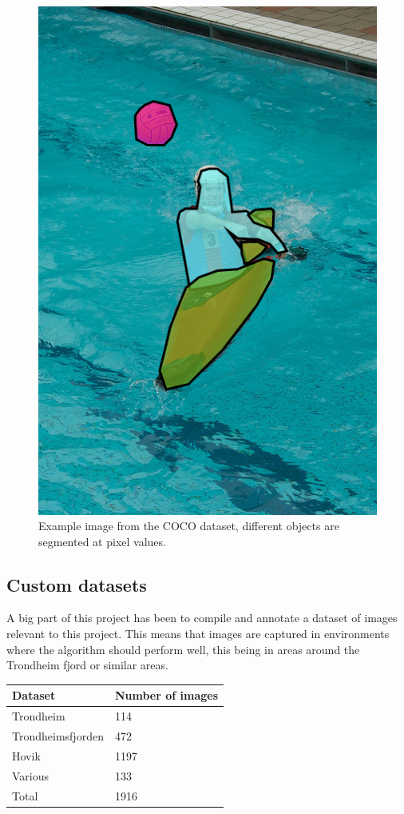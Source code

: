 \begin{figure}[h!]
    \centering
    \includegraphics[scale=0.5]{images/coco.png}
    \caption{Example image from the COCO dataset, different objects are segmented at pixel values.}
    \label{fig:coco}
\end{figure}

\subsection{Custom datasets}
\label{sec:cust_dataset}
A big part of this project has been to compile and annotate a dataset of images relevant to this project. This means that images are captured in environments where the algorithm should perform well, this being in areas around the Trondheim fjord or similar areas.


\begin{table}[h!]
\centering
\begin{tabular}{l|l}
Dataset           & Number of images \\ \hline
Trondheim         & 114              \\
Trondheimsfjorden & 472              \\
Hovik             & 1197             \\
Various           & 133              \\ \hline
Total             & 1916            
\end{tabular}
\end{table}


